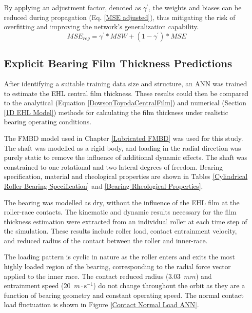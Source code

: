 By applying an adjustment factor, denoted as $\gamma^{\prime}$, the weights and biases can be reduced during propagation (Eq. \ref{MSE adjusted}), thus mitigating the risk of overfitting and improving the network's generalization capability.
\begin{equation}\label{MSE adjusted}
	M S E_{r e g}=\gamma^{\prime} * M S W+\left(1-\gamma^{\prime}\right) * M S E
\end{equation}

\subsection{Explicit Bearing Film Thickness Predictions} \label{Explicit Bearing Film Thickness Predictions}
After identifying a suitable training data size and structure, an ANN was trained to estimate the EHL central film thickness. These results could then be compared to the analytical (Equation \ref{DowsonToyodaCentralFilm}) and numerical (Section \ref{1D EHL Model}) methods for calculating the film thickness under realistic bearing operating conditions.

The FMBD model used in Chapter \ref{Lubricated FMBD} was used for this study. The shaft was modelled as a rigid body, and loading in the radial direction was purely static to remove the influence of additional dynamic effects. The shaft was constrained to one rotational and two lateral degrees of freedom. Bearing specification, material and rheological properties are shown in Tables \ref{Cylindrical Roller Bearing Specification} and \ref{Bearing Rheological Properties}.

The bearing was modelled as dry, without the influence of the EHL film at the roller-race contacts. The kinematic and dynamic results necessary for the film thickness estimation were extracted from an individual roller at each time step of the simulation. These results include roller load, contact entrainment velocity, and reduced radius of the contact between the roller and inner-race.

The loading pattern is cyclic in nature as the roller enters and exits the most highly loaded region of the bearing, corresponding to the radial force vector applied to the inner race. The contact reduced radius (3.03~$mm$) and entrainment speed (20~$m \cdot \mathrm{s}^{-1}$) do not change throughout the orbit as they are a function of bearing geometry and constant operating speed. The normal contact load fluctuation is shown in Figure \ref{Contact Normal Load ANN}.

